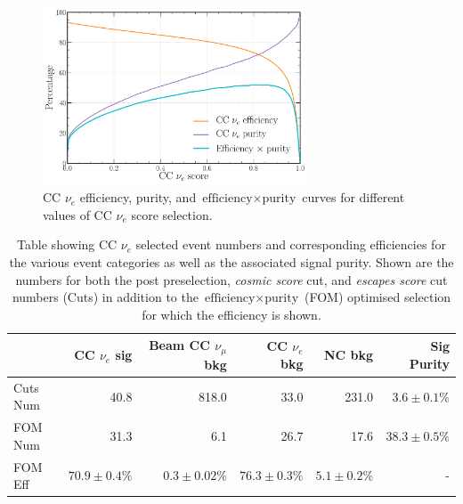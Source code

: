 \begin{figure} %
    \includegraphics[width=0.7\textwidth]{diagrams/7-results/final_nuel_eff_curves.pdf}
    \caption[CC $\nu_{e}$ efficiency, purity, and $\text{efficiency}\times\text{purity}$ curves]
    {CC $\nu_{e}$ efficiency, purity, and $\text{efficiency}\times\text{purity}$ curves for
        different values of CC $\nu_{e}$ score selection.}
    \label{fig:final_nuel_eff_curves}
\end{figure}

\begin{table}
    \begin{tabular}{lrrrrr}
                 & CC $\nu_{e}$ sig & Beam CC $\nu_{\mu}$ bkg & CC $\nu_{e}$ bkg & NC bkg        &
                 Sig Purity     \\
        \midrule
        Cuts Num & 40.8             & 818.0                   & 33.0             & 231.0         &
        $3.6\pm0.1\%$  \\
        FOM Num  & 31.3             & 6.1                     & 26.7             & 17.6          &
        $38.3\pm0.5\%$ \\
        \midrule
        FOM Eff  & $70.9\pm0.4\%$   & $0.3\pm0.02\%$          & $76.3\pm0.3\%$   & $5.1\pm0.2\%$ &
        -              \\
    \end{tabular}
    \caption[Table showing CC $\nu_{e}$ selected event numbers, efficiencies and signal purity]
    {Table showing CC $\nu_{e}$ selected event numbers and corresponding efficiencies for the
        various event categories as well as the associated signal purity. Shown are the numbers
        for both the post preselection, \emph{cosmic score} cut, and \emph{escapes score} cut
        numbers (Cuts) in addition to the $\text{efficiency}\times\text{purity}$ (FOM) optimised
        selection for which the efficiency is shown.}
    \label{tab:nuel_selection}
\end{table}

